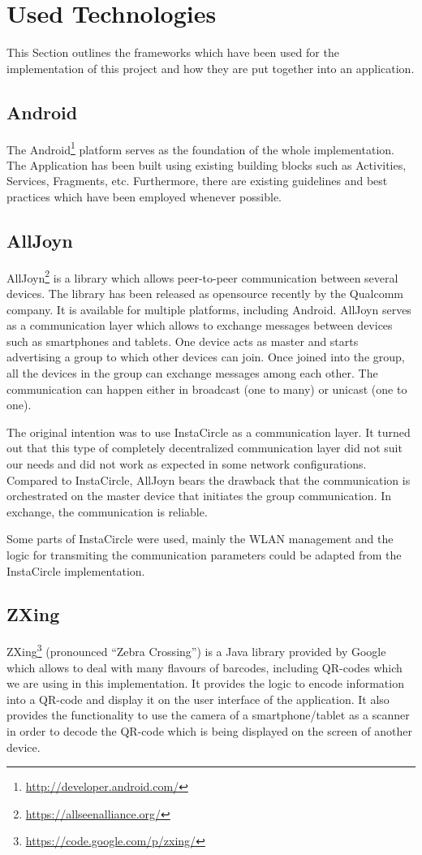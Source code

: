 \documentclass[numbers=noenddot, abstract=on, a4paper, headsepline,
footsepline, oneside, draft=off]{scrreprt}
\begin{document}
\section{Used Technologies}
This Section outlines the frameworks which have been used for the implementation
of this project and how they are put together into an application.
\subsection{Android}
The Android\footnote{\url{http://developer.android.com/}} platform serves as the
foundation of the whole implementation. The Application has been built using existing building blocks such as Activities,
Services, Fragments, etc. Furthermore, there are existing guidelines and best
practices which have been employed whenever possible. 



\subsection{AllJoyn}
AllJoyn\footnote{\url{https://allseenalliance.org/}} is a library which allows
peer-to-peer communication between several devices. The library has been
released as opensource recently by the Qualcomm company. It is available for
multiple platforms, including Android. AllJoyn serves as a communication layer
which allows to exchange messages between devices such as smartphones and
tablets. One device acts as master and starts advertising a group to which other
devices can join. Once joined into the group, all the devices in the group can
exchange messages among each other. The communication can happen either in
broadcast (one to many) or unicast (one to one).

The original intention was to use InstaCircle \cite{ritter13a} as a
communication layer. It turned out that this type of completely decentralized
communication layer did not suit our needs and did not work as expected in some
network configurations. Compared to InstaCircle, AllJoyn bears the drawback that
the communication is orchestrated on the master device that initiates the group
communication. In exchange, the communication is reliable.

Some parts of InstaCircle were used, mainly the WLAN management and the logic
for transmiting the communication parameters could be adapted from the
InstaCircle implementation.

\subsection{ZXing}
ZXing\footnote{\url{https://code.google.com/p/zxing/}} (pronounced ``Zebra
Crossing'') is a Java library provided by Google which allows to deal with many
flavours of barcodes, including QR-codes which we are using in this
implementation. It provides the logic to encode information into a QR-code and
display it on the user interface of the application. It also provides the
functionality to use the camera of a smartphone/tablet as a scanner in order to
decode the QR-code which is being displayed on the screen of another device.
\end{document}
